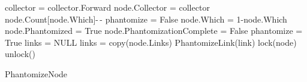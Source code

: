 \setlength{\textfloatsep}{0pt}
\begin{algorithm}[H]
	\scriptsize
	
	\begin{multicols}{2}
		\begin{algorithmic}[1]
{}
\State collector = collector.Forward
\EndWhile
\State node.Collector = collector
\State node.Count[node.Which]-\,-
\State phantomize = False
\Else
{}
\State node.Which = 1-node.Which
\EndIf
{}
\State node.Phantomized = True
\State node.PhantomizationComplete = False
\State phantomize = True
\EndIf
\EndIf
\State links = NULL 
\State links = copy(node.Links)
\EndIf
{}
\State PhantomizeLink(link)
\EndFor
\State lock(node)
\State unlock()
\EndProcedure
\caption{PhantomizeNode}
\label{algorithm:phantomizenode}
\end{algorithmic}
\end{multicols}
\end{algorithm}



